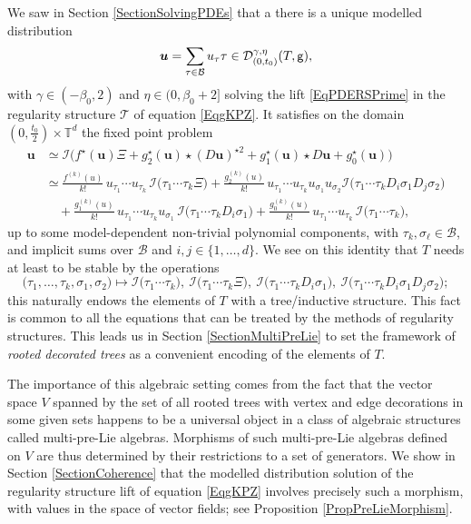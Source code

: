 \documentclass[10pt, reqno]{amsart}
\numberwithin{subsection}{section}
\numberwithin{subsubsection}{subsection}
\numberwithin{equation}{section} %
\theoremstyle{mystyle}
\theoremstyle{mystyle2}
\theoremstyle{mystyle3}
\newcommand{\bsu}{\boldsymbol{u}}
\newcommand{\ssk}{\smallskip}
\newcommand{\bbT}{\mathbb{T}}
\newcommand{\mcB}{\mathcal{B}}
\newcommand{\mcD}{\mathcal{D}}
\newcommand{\mcI}{\mathcal{I}}
\begin{document}
 We saw in Section \ref{SectionSolvingPDEs} that a there is a unique modelled distribution 
$$
\bsu = \sum_{\tau\in\mcB} u_\tau \tau \in \mcD_{(0,t_0)}^{\gamma,\eta}(T,\sf g),
$$ 
with $\gamma\in(-\beta_0,2)$ and $\eta\in(0,\beta_0+2]$ solving the lift \eqref{EqPDERSPrime} in the regularity structure $\mathscr{T}$ of equation \eqref{EqgKPZ}. It satisfies on the domain $(0,\frac{t_0}2)\times\bbT^d$ the fixed point problem
\begin{equation}   \label{EqIdentification1} \begin{split}
\bsu &\simeq \mcI\Big(f^\star(\bsu)\Xi + g_2^\star(\bsu) \star ( D\bsu  )^{\star2} + g_1^\star(\bsu) \star D\bsu   + g_0^\star(\bsu) \Big)\\
   &\simeq \frac{f^{(k)}(u)}{k!}\,u_{\tau_1}\cdots u_{\tau_k}\,\mcI\big(\tau_1\cdots\tau_k \Xi\big)   
   + \frac{g_2^{(k)}(u)}{k!}\,u_{\tau_1}\cdots u_{\tau_k}u_{\sigma_1}u_{\sigma_2} \mcI\big(\tau_1\cdots\tau_kD_i\sigma_1D_j\sigma_2\big)\\
   &\quad+ \frac{g_1^{(k)}(u)}{k!}\,u_{\tau_1}\cdots u_{\tau_k}u_{\sigma_1}\,\mcI\big(\tau_1\cdots\tau_kD_i\sigma_1\big)
   + \frac{g_0^{(k)}(u)}{k!}\,u_{\tau_1}\cdots u_{\tau_k}\,\mcI\big(\tau_1\cdots\tau_k\big),
\end{split}   \end{equation}
up to some model-dependent non-trivial polynomial components, with $\tau_k, \sigma_\ell\in\mcB$, and implicit sums over $\mcB$ and $i,j\in\{1,\dots,d\}$. We see on this identity that $T$ needs at least to be stable by the operations 
$$
\big(\tau_1,\dots,\tau_k,\sigma_1,\sigma_2\big) \mapsto
\mcI\big(\tau_1\cdots\tau_k\big),\
\mcI\big(\tau_1\cdots\tau_k\Xi\big),\
\mcI\big(\tau_1\cdots\tau_kD_i\sigma_1\big),\
\mcI\big(\tau_1\cdots\tau_kD_i\sigma_1D_j\sigma_2\big);
$$
this naturally endows the elements of $T$ with a tree/inductive structure. This fact is common to all the equations that can be treated by the methods of regularity structures. This leads us in Section \ref{SectionMultiPreLie} to set the framework of {\it rooted decorated trees} as a convenient encoding of the elements of $T$. 

\ssk

 The importance of this algebraic setting comes from the fact that the vector space $V$ spanned by the set of all rooted trees with vertex and edge decorations in some given sets happens to be a universal object in a class of algebraic structures called multi-pre-Lie algebras. Morphisms of such multi-pre-Lie algebras defined on $V$ are thus determined by their restrictions to a set of generators. We show in Section \ref{SectionCoherence} that the modelled distribution solution of the regularity structure lift of equation \eqref{EqgKPZ} involves precisely such a morphism, with values in the space of vector fields; see Proposition \ref{PropPreLieMorphism}. 
\end{document}
